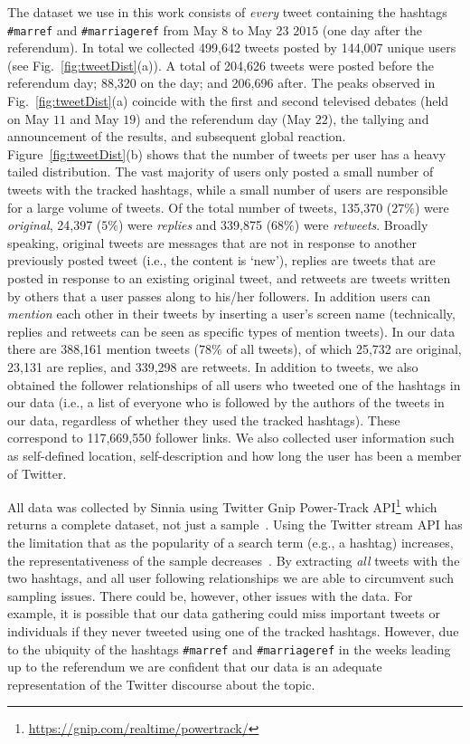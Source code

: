 \documentclass{article}
\begin{document}
The dataset we use in this work consists of {\it every} tweet
containing the hashtags {\tt \#marref} and {\tt \#marriageref} from
May 8 to May 23 $2015$ (one day after the referendum). In total we
collected 499,642 tweets posted by 144,007 unique users (see
Fig.~\ref{fig:tweetDist}(a)). A total of 204,626 tweets were posted
before the referendum day; 88,320 on the day; and 206,696 after. The
peaks observed in Fig.~\ref{fig:tweetDist}(a) coincide with the first
and second televised debates (held on May $11$ and May $19$) and the
referendum day (May $22$), the tallying and announcement of the
results, and subsequent global reaction. Figure~\ref{fig:tweetDist}(b)
shows that the number of tweets per user has a heavy tailed
distribution. The vast majority of users only posted a small number of
tweets with the tracked hashtags, while a small number of users are
responsible for a large volume of tweets. Of the total number of
tweets, 135,370 ($27\%$) were {\it original}, 24,397 ($5\%$) were {\it
  replies} and 339,875 ($68\%$) were {\it retweets}. Broadly speaking,
original tweets are messages that are not in response to another
previously posted tweet (i.e., the content is `new'), replies are
tweets that are posted in response to an existing original tweet, and
retweets are tweets written by others that a user passes along to
his/her followers. In addition users can {\it mention} each other in
their tweets by inserting a user's screen name (technically, replies
and retweets can be seen as specific types of mention tweets).  In our
data there are 388,161 mention tweets ($78\%$ of all tweets), of which
25,732 are original, 23,131 are replies, and 339,298 are retweets. In
addition to tweets, we also obtained the follower relationships of all
users who tweeted one of the hashtags in our data (i.e., a list of
everyone who is followed by the authors of the tweets in our data,
regardless of whether they used the tracked hashtags). These
correspond to 117,669,550 follower links. We also collected user
information such as self-defined location, self-description and how
long the user has been a member of Twitter.

All data was collected by Sinnia using Twitter Gnip Power-Track
API\footnote{\url{https://gnip.com/realtime/powertrack/}} which
returns a complete dataset, not just a
sample~\cite{goel2015StrVirOnlineDiff}. Using the Twitter stream API
has the limitation that as the popularity of a search term (e.g., a
hashtag) increases, the representativeness of the sample
decreases~\cite{Morstatter2013SampleGoodEnough}. By extracting {\it
  all} tweets with the two hashtags, and all user following
relationships we are able to circumvent such sampling issues. There
could be, however, other issues with the data.  For example, it is
possible that our data gathering could miss important tweets or
individuals if they never tweeted using one of the tracked
hashtags. However, due to the ubiquity of the hashtags {\tt \#marref}
and {\tt \#marriageref} in the weeks leading up to the referendum we
are confident that our data is an adequate representation of the
Twitter discourse about the topic.
\end{document}
